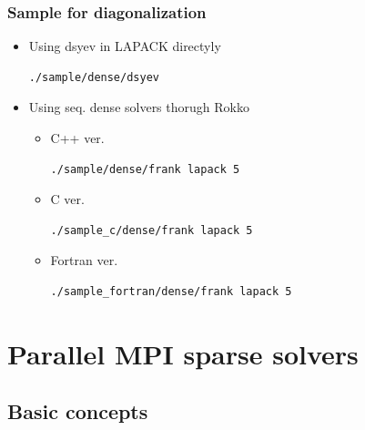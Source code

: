 \begin{frame}[c,fragile]
  \frametitle{Sample for diagonalization}
  \begin{itemize}
  \item Using dsyev in LAPACK directyly 
\begin{lstlisting}[style=shstyle]
./sample/dense/dsyev
\end{lstlisting}
  \item Using seq. dense solvers thorugh Rokko
  \begin{itemize}
    \item C++ ver. 
\begin{lstlisting}[style=shstyle]
./sample/dense/frank lapack 5
\end{lstlisting}
    \item C ver. 
\begin{lstlisting}[style=shstyle]
./sample_c/dense/frank lapack 5
\end{lstlisting}
    \item Fortran ver. 
\begin{lstlisting}[style=shstyle]
./sample_fortran/dense/frank lapack 5
\end{lstlisting}
    \end{itemize}
  \end{itemize}
\end{frame}

\section{Parallel MPI sparse solvers}

\subsection{Basic concepts}

